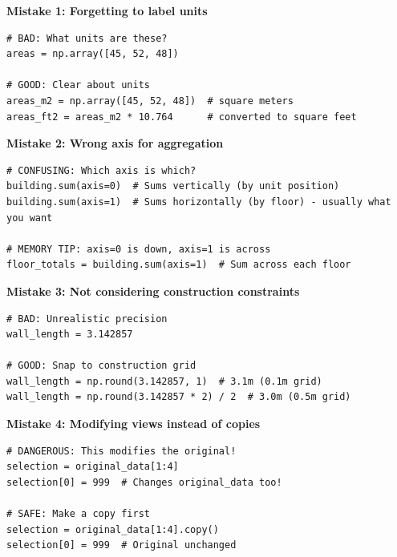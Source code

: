 
\begin{tcolorbox}[
    title=Avoid These Common Pitfalls,
    colframe=red,
    colback = white,
    arc=2mm
]
\textbf{Mistake 1: Forgetting to label units}
\begin{lstlisting}[basicstyle=\ttfamily\footnotesize,breaklines=true,columns=fullflexible,keepspaces=true,xleftmargin=0pt]
# BAD: What units are these?
areas = np.array([45, 52, 48])

# GOOD: Clear about units
areas_m2 = np.array([45, 52, 48])  # square meters
areas_ft2 = areas_m2 * 10.764      # converted to square feet

\end{lstlisting}

\textbf{Mistake 2: Wrong axis for aggregation}
\begin{lstlisting}[basicstyle=\ttfamily\footnotesize,breaklines=true,columns=fullflexible,keepspaces=true,xleftmargin=0pt]
# CONFUSING: Which axis is which?
building.sum(axis=0)  # Sums vertically (by unit position)
building.sum(axis=1)  # Sums horizontally (by floor) - usually what you want

# MEMORY TIP: axis=0 is down, axis=1 is across
floor_totals = building.sum(axis=1)  # Sum across each floor

\end{lstlisting}

\textbf{Mistake 3: Not considering construction constraints}
\begin{lstlisting}[basicstyle=\ttfamily\footnotesize,breaklines=true,columns=fullflexible,keepspaces=true,xleftmargin=0pt]
# BAD: Unrealistic precision
wall_length = 3.142857 

# GOOD: Snap to construction grid
wall_length = np.round(3.142857, 1)  # 3.1m (0.1m grid)
wall_length = np.round(3.142857 * 2) / 2  # 3.0m (0.5m grid)

\end{lstlisting}

\textbf{Mistake 4: Modifying views instead of copies}
\begin{lstlisting}[basicstyle=\ttfamily\footnotesize,breaklines=true,columns=fullflexible,keepspaces=true,xleftmargin=0pt]
# DANGEROUS: This modifies the original!
selection = original_data[1:4]
selection[0] = 999  # Changes original_data too!

# SAFE: Make a copy first
selection = original_data[1:4].copy()
selection[0] = 999  # Original unchanged

\end{lstlisting}
\end{tcolorbox}

